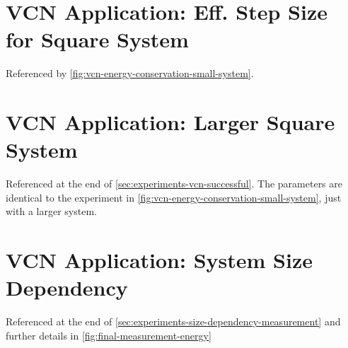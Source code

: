 \begin{minipage}{\textwidth}
    \section{VCN Application: Eff. Step Size for Square System} %
        \label{appendix:vcn-success-small}
        Referenced by \autoref{fig:vcn-energy-conservation-small-system}.\\
        \vbox{
        }
\end{minipage}

\begin{minipage}{\textwidth}
    \section{VCN Application: Larger Square System} %
        \label{appendix:vcn-success-big}
        Referenced at the end of \autoref{sec:experiments-vcn-successful}. The parameters are identical to the experiment in \autoref{fig:vcn-energy-conservation-small-system}, just with a larger system.\\
        \vbox{
        }
\end{minipage}
\newpage
\begin{minipage}{\textwidth}
    \vbox{
    }
\end{minipage}

\begin{minipage}{\textwidth}
    \section{VCN Application: System Size Dependency} %
        \label{appendix:vcn-system-size-dependency}
        Referenced at the end of \autoref{sec:experiments-size-dependency-measurement} and further details in \autoref{fig:final-measurement-energy}\\
        \vbox{
        }
\end{minipage}
\newpage
\begin{minipage}{\textwidth}
    \vbox{
    }
\end{minipage}

